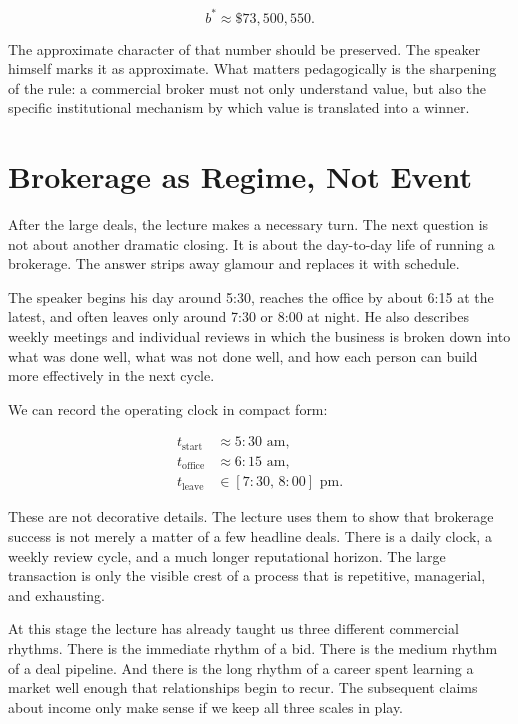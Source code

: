 \begin{equation}
b^{\ast} \approx \$73{,}500{,}550.
\end{equation}

The approximate character of that number should be preserved. The speaker himself marks it as approximate. What matters pedagogically is the sharpening of the rule: a commercial broker must not only understand value, but also the specific institutional mechanism by which value is translated into a winner.

\section{Brokerage as Regime, Not Event}

After the large deals, the lecture makes a necessary turn. The next question is not about another dramatic closing. It is about the day-to-day life of running a brokerage. The answer strips away glamour and replaces it with schedule.

The speaker begins his day around 5:30, reaches the office by about 6:15 at the latest, and often leaves only around 7:30 or 8:00 at night. He also describes weekly meetings and individual reviews in which the business is broken down into what was done well, what was not done well, and how each person can build more effectively in the next cycle.

We can record the operating clock in compact form:

\begin{align}
t_{\text{start}} &\approx 5{:}30 \text{ am}, \\
t_{\text{office}} &\approx 6{:}15 \text{ am}, \\
t_{\text{leave}} &\in [7{:}30,\,8{:}00] \text{ pm}.
\end{align}

These are not decorative details. The lecture uses them to show that brokerage success is not merely a matter of a few headline deals. There is a daily clock, a weekly review cycle, and a much longer reputational horizon. The large transaction is only the visible crest of a process that is repetitive, managerial, and exhausting.

At this stage the lecture has already taught us three different commercial rhythms. There is the immediate rhythm of a bid. There is the medium rhythm of a deal pipeline. And there is the long rhythm of a career spent learning a market well enough that relationships begin to recur. The subsequent claims about income only make sense if we keep all three scales in play.

